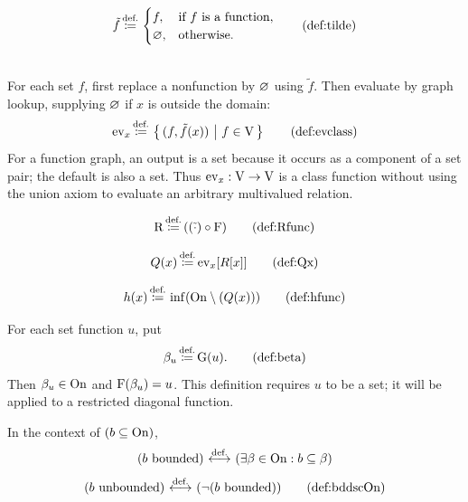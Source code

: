 \begin{definition}[tilde]
\[
\tilde{f}\eqdef
\begin{cases}
    f,& \text{if }f\text{ is a function},\\
    \emptyclass,& \text{otherwise}.
\end{cases}
\labeltagd{def}{tilde}
\]
\end{definition}
\begin{definition}\ \\
For each set $f$, first replace a nonfunction by $\varnothing$ using
$\tilde f$. Then evaluate by graph lookup, supplying $\varnothing$ if
$x$ is outside the domain:
\[
\ev_x\eqdef\cc{(f,\tilde f(x))}{f\in\V}
\labeltagd{def}{evclass}
\]
For a function graph, an output is a set because it occurs as a component
of a set pair; the default is also a set. Thus $\mathrm{ev}_x:\mathrm{V}\to\mathrm{V}$ is a
class function without using the union axiom to evaluate an arbitrary
multivalued relation.
\end{definition}
\begin{definition}[R function]
\[
\text{R}\eqdef((\tilde{\cdot})\circ \F)
\labeltagd{def}{Rfunc}
\]
\end{definition}
\begin{definition}[Q(x)]
\[
Q(x)\eqdef\ev_x[R[x]]
\labeltagd{def}{Qx}
\]
\end{definition}

\begin{definition}[h function]
\[
h(x)\eqdef\inf(\On\setminus(Q(x)))
\labeltagd{def}{hfunc}
\]
\end{definition}
\begin{definition}
For each set function $u$, put
\[
\beta_u\eqdef\G(u).
\labeltagd{def}{beta}
\]
Then $\beta_u\in\mathrm{On}$ and $\mathrm{F}(\beta_u)=u$. This definition requires $u$
to be a set; it will be applied to a restricted diagonal function.
\end{definition}
\begin{definition}
In the context of $(b\subseteq\mathrm{On})$,
\[
(b\text{ bounded})\ {\stackrel{{\textrm{def.}}}{\longleftrightarrow}}\ (\exists \beta\in\mathrm{On}:b\subseteq\beta)
\]
\[
(b\text{ unbounded})\iffdef(\neg(b\text{ bounded}))
\labeltagd{def}{bddscOn}
\]
\end{definition}

